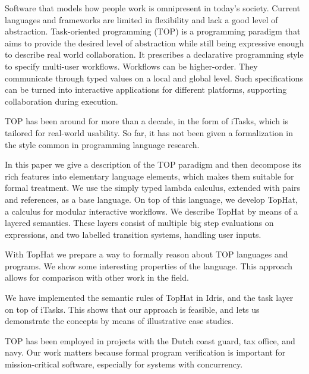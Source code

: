 
Software that models how people work is omnipresent in today's society.
Current languages and frameworks are limited in flexibility and lack a good level of abstraction.
Task-oriented programming (TOP) is a programming paradigm that aims to provide the desired level of abstraction while still being expressive enough to describe real world collaboration.
It prescribes a declarative programming style to specify multi-user workflows.
Workflows can be higher-order.
They communicate through typed values on a local and global level.
Such specifications can be turned into interactive applications for different platforms, supporting collaboration during execution.

TOP has been around for more than a decade, in the form of iTasks, which is tailored for real-world usability.
So far, it has not been given a formalization in the style common in programming language research.

In this paper we give a description of the TOP paradigm and then decompose its rich features into elementary language elements, which makes them suitable for formal treatment.
We use the simply typed lambda calculus, extended with pairs and references, as a base language.
On top of this language, we develop TopHat, a calculus for modular interactive workflows.
We describe TopHat by means of a layered semantics.
These layers consist of multiple big step evaluations on expressions, and two labelled transition systems, handling user inputs.

With TopHat we prepare a way to formally reason about TOP languages and programs.
We show some interesting properties of the language.
This approach allows for comparison with other work in the field.

We have implemented the semantic rules of TopHat in Idris, and the task layer on top of iTasks.
This shows that our approach is feasible, and lets us demonstrate the concepts by means of illustrative case studies.

TOP has been employed in projects with the Dutch coast guard, tax office, and navy.
Our work matters because formal program verification is important for mission-critical software, especially for systems with concurrency.



